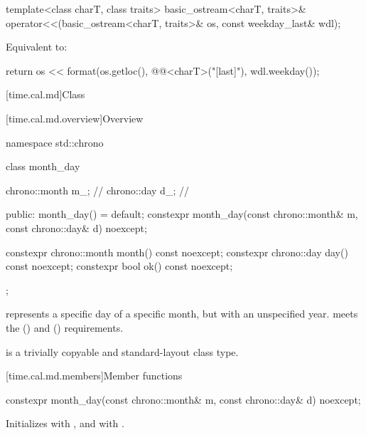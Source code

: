 %
\begin{itemdecl}
template<class charT, class traits>
  basic_ostream<charT, traits>&
    operator<<(basic_ostream<charT, traits>& os, const weekday_last& wdl);
\end{itemdecl}

\begin{itemdescr}
\pnum
\effects
Equivalent to:
\begin{codeblock}
return os << format(os.getloc(), @@<charT>("{}[last]"), wdl.weekday());
\end{codeblock}
\end{itemdescr}

[time.cal.md]{Class }

[time.cal.md.overview]{Overview}

\begin{codeblock}
namespace std::chrono {
  class month_day {
    chrono::month m_;           // \expos
    chrono::day   d_;           // \expos

  public:
    month_day() = default;
    constexpr month_day(const chrono::month& m, const chrono::day& d) noexcept;

    constexpr chrono::month month() const noexcept;
    constexpr chrono::day   day()   const noexcept;
    constexpr bool ok() const noexcept;
  };
}
\end{codeblock}

\pnum
{} represents a specific day of a specific month,
but with an unspecified year.
 meets the  ()
and  () requirements.

\pnum
{} is a trivially copyable and standard-layout class type.

[time.cal.md.members]{Member functions}

%
\begin{itemdecl}
constexpr month_day(const chrono::month& m, const chrono::day& d) noexcept;
\end{itemdecl}

\begin{itemdescr}
\pnum
\effects
Initializes  with , and  with .
\end{itemdescr}

